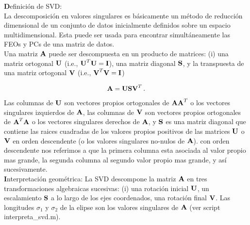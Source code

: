 \documentclass[
]{agujournal2019}
\begin{document}
\begin{framed}
{\noindent \textbf Definición de SVD:}
\\
La descomposición en valores singulares es básicamente un método de
reducción dimensional de un conjunto de datos inicialmente definidos sobre
un espacio multidimensional. Esta puede ser usada para encontrar simultáneamente
las FEOs y PCs de una matriz de datos.
\\

Una matriz ${\textbf A}$ puede ser descompuesta en un producto de
matrices: (i) una matriz ortogonal ${\textbf U}$ (i.e., ${\textbf U}^T{\textbf U}={\textbf I}$), una matriz
diagonal ${\textbf S}$, y la transpuesta de una matriz ortogonal
${\textbf V}$ (i.e., ${\textbf V}^T{\textbf V}={\textbf I}$)

$${\textbf A}={\textbf U}{\textbf S}{\textbf V}^T\,.$$

Las columnas de ${\textbf U}$ son vectores propios ortogonales de
${\textbf A}{\textbf A}^T$ o los vectores singulares izquierdos de ${\textbf A}$,
las columnas de ${\textbf V}$ son vectores propios ortogonales de
${\textbf A}^T{\textbf A}$ o los vectores singulares derechos de ${\textbf A}$,
y ${\textbf S}$ es una matriz diagonal que contiene las raices cuadradas
de los valores propios positivos de las matrices  ${\textbf U}$ o ${\textbf V}$
en orden descendente (o los valores singulares no-nulos de ${\textbf A}$). con orden
descendente nos referimos a que la primera
columna esta asociada al valor propio mas grande, la segunda columna al
segundo valor propio mas grande, y así sucesivamente.
\\
{\textbf Interpretación geométrica:} La SVD descompone la matriz ${\textbf A}$ en tres transformaciones
algebraicas sucesivas: (i) una rotación inicial
${\textbf U}$, un escalamiento ${\textbf S}$ a lo largo de los ejes coordenados, una rotación final
${\textbf V}$. Las longitudes $\sigma_1$ y $\sigma_2$ de la elipse son los valores
singulares de ${\textbf A}$ (ver script interpreta\_svd.m).

\end{framed}
\end{document}
